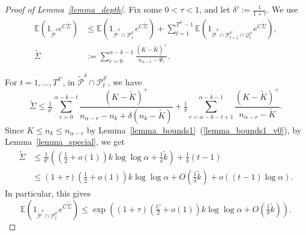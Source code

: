 \documentclass{article}
\theoremstyle{plain}
\theoremstyle{remark}
\theoremstyle{plain}
\numberwithin{equation}{section}
\begin{document}
	\begin{proof}[Proof of Lemma~\ref{lemma_depth}]
		Fix some $0<\tau<1$, and let $\delta':=\tfrac1{1+\tau}$. We use
		\begin{align}
			\mathbb{E}(1_{\widetilde{\mathcal{P}}^{\delta}}e^{C\widetilde{\Sigma}})
			&\leq\mathbb{E}(1_{\widetilde{\mathcal{P}}^{\delta}\cap\mathcal{P}_1^{\delta'}}e^{C\widetilde{\Sigma}})+\sum_{t=1}^{T^{\delta'}-1}\mathbb{E}(1_{\widetilde{\mathcal{P}}^{\delta}\cap\mathcal{P}_{t+1}^{\delta'}\cap\mathcal{Q}_t^{\delta'}}e^{C\widetilde{\Sigma}}),
			\\\widetilde{\Sigma}
			&:=\sum_{r=0}^{\alpha-k-1}\frac{(K-\widetilde{K})^+}{n_{\alpha-r}-\Psi_r}.
		\end{align}
		
		For $t=1,\ldots,T^{\delta'}$, in $\widetilde{\mathcal{P}}^{\delta}\cap\mathcal{P}_t^{\delta'}$, we have $$\widetilde{\Sigma}\leq\tfrac1{\delta'}\sum_{r=0}^{\alpha-k-t}\frac{(K-\widetilde{K})^+}{n_{\alpha-r}-n_k+\delta(n_k-\widetilde{K})}+\tfrac1{\delta}\sum_{r=\alpha-k-t+1}^{\alpha-k-1}\frac{(K-\widetilde{K})^+}{n_{\alpha-r}-\widetilde{K}}.$$ Since $K\leq n_k\leq n_{\alpha-r}$ by Lemma~\ref{lemma_bounds1}~(\ref{lemma_bounds1_v0}), by Lemma~\ref{lemma_special}, we get
		\begin{align}
			\widetilde{\Sigma}
			&\leq\tfrac1{\delta'}\left((\tfrac12+o(1))k\log\log\alpha+\tfrac1{\delta}\widetilde{k}\right)+\tfrac1{\delta}(t-1)
			\\&\leq(1+\tau)(\tfrac12+o(1))k\log\log\alpha+O(\tfrac1{\delta}\widetilde{k})+o((t-1)\log\alpha).
		\end{align}
		In particular, this gives $$\mathbb{E}(1_{\widetilde{\mathcal{P}}^{\delta}\cap\mathcal{P}_1^{\delta'}}e^{C\tilde{\Sigma}})\leq\exp\left((1+\tau)(\tfrac{C}{2}+o(1))k\log\log\alpha+O(\tfrac1{\delta}\widetilde{k})\right).$$
		

\end{proof}
\end{document}
